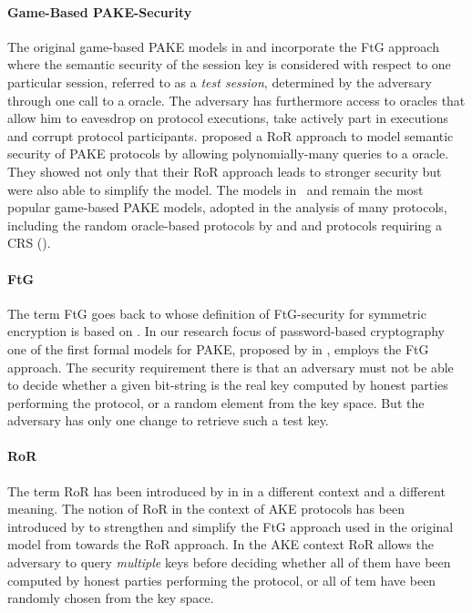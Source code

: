 \paragraph{Game-Based \ac{PAKE}-Security}
The original game-based \ac{PAKE} models in \citet{Bellare2000} and \citet{Boyko2000} incorporate the \ac{FtG} approach where the semantic security of the session key is considered with respect to one particular session, referred to as a \emph{test session}, determined by the adversary through one call to a \Test oracle.
The adversary has furthermore access to oracles that allow him to eavesdrop on protocol executions, take actively part in executions and corrupt protocol participants.
\citet{Abdalla2005} proposed a \ac{RoR} approach to model semantic security of PAKE protocols by allowing polynomially-many queries to a \Test oracle.
They showed not only that their \ac{RoR} approach leads to stronger security but were also able to simplify the model.
The models in~\citet{Bellare2000} and \citet{Abdalla2005} remain the most popular game-based PAKE models, adopted in the analysis of many protocols, including the random oracle-based protocols by \citet{Abdalla2006} and \citet{Abdalla2005b} and protocols requiring a \ac{CRS} (\citet{KatzOY01,Gennaro2003,Gennaro2008,Katz2009a}).


\paragraph{\acl{FtG}}
The term \acl{FtG} goes back to \citet{Bellare97} \cite{Bellare97} whose definition of \ac{FtG}-security for symmetric encryption is based on \cite{Goldwasser84} \cite{Micali86}.
In our research focus of password-based cryptography one of the first formal models for \ac{PAKE}, proposed by \citet{Bellare2000} in \cite{Bellare2000}, employs the \ac{FtG} approach.
The security requirement there is that an adversary must not be able to decide whether a given bit-string is the real key computed by honest parties performing the protocol, or a random element from the key space.
But the adversary has only one change to retrieve such a test key.

\paragraph{\acl{RoR}}
The term \acl{RoR} has been introduced by \citet{Bellare97} in \cite{Bellare97} in a different context and a different meaning.
The notion of \ac{RoR} in the context of \acl{AKE} protocols has been introduced by \citet{Abdalla2005} to strengthen and simplify the \ac{FtG} approach used in the original model from \cite{Bellare2000} towards the \ac{RoR} approach.
In the \ac{AKE} context \ac{RoR} allows the adversary to query \emph{multiple} keys before deciding whether all of them have been computed by honest parties performing the protocol, or all of tem  have been randomly chosen from the key space.

